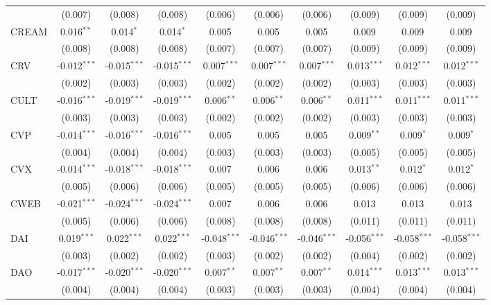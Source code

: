 \begin{table}[!htbp]
\begin{tabular}{@{\extracolsep{5pt}}lccccccccc}
  & (0.007) & (0.008) & (0.008) & (0.006) & (0.006) & (0.006) & (0.009) & (0.009) & (0.009) \\
 CREAM & 0.016$^{**}$ & 0.014$^{*}$ & 0.014$^{*}$ & 0.005$^{}$ & 0.005$^{}$ & 0.005$^{}$ & 0.009$^{}$ & 0.009$^{}$ & 0.009$^{}$ \\
  & (0.008) & (0.008) & (0.008) & (0.007) & (0.007) & (0.007) & (0.009) & (0.009) & (0.009) \\
 CRV & -0.012$^{***}$ & -0.015$^{***}$ & -0.015$^{***}$ & 0.007$^{***}$ & 0.007$^{***}$ & 0.007$^{***}$ & 0.013$^{***}$ & 0.012$^{***}$ & 0.012$^{***}$ \\
  & (0.002) & (0.003) & (0.003) & (0.002) & (0.002) & (0.002) & (0.003) & (0.003) & (0.003) \\
 CULT & -0.016$^{***}$ & -0.019$^{***}$ & -0.019$^{***}$ & 0.006$^{**}$ & 0.006$^{**}$ & 0.006$^{**}$ & 0.011$^{***}$ & 0.011$^{***}$ & 0.011$^{***}$ \\
  & (0.003) & (0.003) & (0.003) & (0.002) & (0.002) & (0.002) & (0.003) & (0.003) & (0.003) \\
 CVP & -0.014$^{***}$ & -0.016$^{***}$ & -0.016$^{***}$ & 0.005$^{}$ & 0.005$^{}$ & 0.005$^{}$ & 0.009$^{**}$ & 0.009$^{*}$ & 0.009$^{*}$ \\
  & (0.004) & (0.004) & (0.004) & (0.003) & (0.003) & (0.003) & (0.005) & (0.005) & (0.005) \\
 CVX & -0.014$^{***}$ & -0.018$^{***}$ & -0.018$^{***}$ & 0.007$^{}$ & 0.006$^{}$ & 0.006$^{}$ & 0.013$^{**}$ & 0.012$^{*}$ & 0.012$^{*}$ \\
  & (0.005) & (0.006) & (0.006) & (0.005) & (0.005) & (0.005) & (0.006) & (0.006) & (0.006) \\
 CWEB & -0.021$^{***}$ & -0.024$^{***}$ & -0.024$^{***}$ & 0.007$^{}$ & 0.006$^{}$ & 0.006$^{}$ & 0.013$^{}$ & 0.013$^{}$ & 0.013$^{}$ \\
  & (0.005) & (0.006) & (0.006) & (0.008) & (0.008) & (0.008) & (0.011) & (0.011) & (0.011) \\
 DAI & 0.019$^{***}$ & 0.022$^{***}$ & 0.022$^{***}$ & -0.048$^{***}$ & -0.046$^{***}$ & -0.046$^{***}$ & -0.056$^{***}$ & -0.058$^{***}$ & -0.058$^{***}$ \\
  & (0.003) & (0.002) & (0.002) & (0.003) & (0.002) & (0.002) & (0.004) & (0.002) & (0.002) \\
 DAO & -0.017$^{***}$ & -0.020$^{***}$ & -0.020$^{***}$ & 0.007$^{**}$ & 0.007$^{**}$ & 0.007$^{**}$ & 0.014$^{***}$ & 0.013$^{***}$ & 0.013$^{***}$ \\
  & (0.004) & (0.004) & (0.004) & (0.003) & (0.003) & (0.003) & (0.004) & (0.004) & (0.004) \\

\end{tabular}
\end{table}
